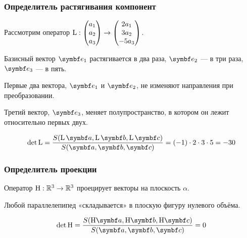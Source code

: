 \begin{frame}
    \frametitle{Определитель растягивания компонент}


    Рассмотрим оператор $\operatorname{L} : \begin{pmatrix}
      a_1 \\
      a_2 \\
      a_3 \\
    \end{pmatrix} \to 
    \begin{pmatrix}
      2a_1 \\
      3a_2 \\
      -5a_3 \\
    \end{pmatrix}$.
    

    \pause

    Базисный вектор $\be_1$ растягивается в два раза, $\be_2$ — в три раза, $\be_3$ — в пять.


    Первые два вектора, $\be_1$ и $\be_2$, не изменяют направления при преобразовании.

    
    Третий вектор, $\be_3$, меняет полупространство, в котором он лежит относительно первых двух. 

    \pause

    \[
    \det \LL = \frac{S(\LL \ba, \LL \bb, \LL \bc )}{S(\ba, \bb, \bc )} = (-1)\cdot 2\cdot 3\cdot 5  = - 30
    \]

\end{frame}



\begin{frame}
    \frametitle{Определитель проекции}


    Оператор $\mathrm{H} : \mathbb{R}^3 \to \mathbb{R}^3$ проецирует векторы на плоскость $\alpha$. 

    \pause

    Любой параллелепипед «складывается» в плоскую фигуру нулевого объёма.

    \pause

    \[
    \det \HH = \frac{S(\HH \ba, \HH \bb, \HH \bc )}{S(\ba, \bb, \bc )} = 0
    \]

\end{frame}


